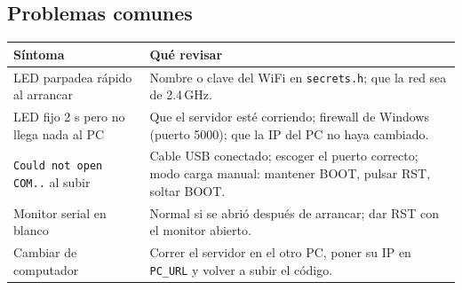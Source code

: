 \documentclass[11pt,a4paper]{article}
\begin{document}
\subsection{Problemas comunes}

\begin{center}
\begin{tabular}{@{}p{5.2cm}p{9.5cm}@{}}
\toprule
\textbf{Síntoma} & \textbf{Qué revisar}\\
\midrule
LED parpadea rápido al arrancar & Nombre o clave del WiFi en \texttt{secrets.h}; que la red sea de 2.4\,GHz.\\
LED fijo 2 s pero no llega nada al PC & Que el servidor esté corriendo; firewall de Windows (puerto 5000); que la IP del PC no haya cambiado.\\
\texttt{Could not open COM..} al subir & Cable USB conectado; escoger el puerto correcto; modo carga manual: mantener BOOT, pulsar RST, soltar BOOT.\\
Monitor serial en blanco & Normal si se abrió después de arrancar; dar RST con el monitor abierto.\\
Cambiar de computador & Correr el servidor en el otro PC, poner su IP en \texttt{PC\_URL} y volver a subir el código.\\
\bottomrule
\end{tabular}
\end{center}
\end{document}
